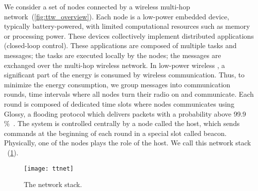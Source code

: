 We consider a set of nodes connected by a wireless multi-hop network~(\cref{fig:ttw_overview}).
Each node is a low-power embedded device, typically battery-powered, with limited computational resources such as memory or processing power.
These devices collectively implement distributed applications (\eg closed-loop control). These applications are composed of multiple tasks and messages; the tasks are executed locally by the nodes; the messages are exchanged over the multi-hop wireless network.
In low-power wireless \CPS, a significant part of the energy is consumed by wireless communication. Thus, to minimize the energy consumption, we group messages into communication rounds, \ie time intervals where all nodes turn their radio on and communicate.
Each round is composed of dedicated time slots where nodes communicates using Glossy, a flooding protocol which delivers packets with a probability above 99.9\,\%~\cite{ferrari2011Glossy}.
The system is controlled centrally by a node called the host, which sends commands at the beginning of each round in a special slot called beacon.
Physically, one of the nodes plays the role of the host.
We call this network stack \TTnet~(\cref{fig:ttnet}).


\begin{figure}
	\centering
	\texttt{[image: ttnet]}
	\caption{The \TTnet network stack.
	}
	\label{fig:ttnet}
\end{figure}


